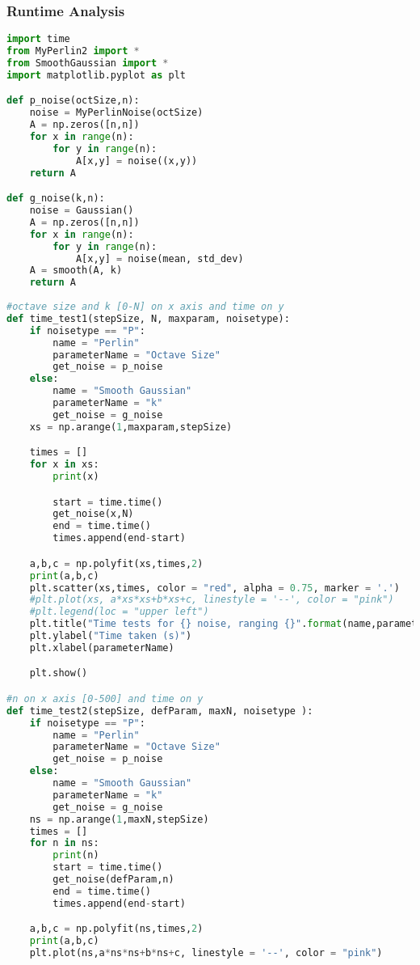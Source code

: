 \documentclass[11pt,a4paper]{article}
\begin{document}
\subsubsection{Runtime Analysis}
\begin{lstlisting}[language=Python, mathescape=true]
import time
from MyPerlin2 import *
from SmoothGaussian import *
import matplotlib.pyplot as plt

def p_noise(octSize,n):
    noise = MyPerlinNoise(octSize)
    A = np.zeros([n,n])
    for x in range(n):
        for y in range(n):
            A[x,y] = noise((x,y))
    return A

def g_noise(k,n):
    noise = Gaussian()
    A = np.zeros([n,n])
    for x in range(n):
        for y in range(n):
            A[x,y] = noise(mean, std_dev)
    A = smooth(A, k)
    return A
 
#octave size and k [0-N] on x axis and time on y
def time_test1(stepSize, N, maxparam, noisetype):
    if noisetype == "P":
        name = "Perlin"
        parameterName = "Octave Size"
        get_noise = p_noise
    else:
        name = "Smooth Gaussian"
        parameterName = "k"
        get_noise = g_noise
    xs = np.arange(1,maxparam,stepSize)

    times = []
    for x in xs:
        print(x)

        start = time.time()
        get_noise(x,N)
        end = time.time()
        times.append(end-start)

    a,b,c = np.polyfit(xs,times,2)
    print(a,b,c)
    plt.scatter(xs,times, color = "red", alpha = 0.75, marker = '.')
    #plt.plot(xs, a*xs*xs+b*xs+c, linestyle = '--', color = "pink")
    #plt.legend(loc = "upper left")
    plt.title("Time tests for {} noise, ranging {}".format(name,parameterName))
    plt.ylabel("Time taken (s)")
    plt.xlabel(parameterName)

    plt.show()

#n on x axis [0-500] and time on y
def time_test2(stepSize, defParam, maxN, noisetype ):
    if noisetype == "P":
        name = "Perlin"
        parameterName = "Octave Size"
        get_noise = p_noise
    else:
        name = "Smooth Gaussian"
        parameterName = "k"
        get_noise = g_noise
    ns = np.arange(1,maxN,stepSize)
    times = []
    for n in ns:
        print(n)
        start = time.time()
        get_noise(defParam,n)
        end = time.time()
        times.append(end-start)

    a,b,c = np.polyfit(ns,times,2)
    print(a,b,c)
    plt.plot(ns,a*ns*ns+b*ns+c, linestyle = '--', color = "pink")


\end{lstlisting}
\end{document}
